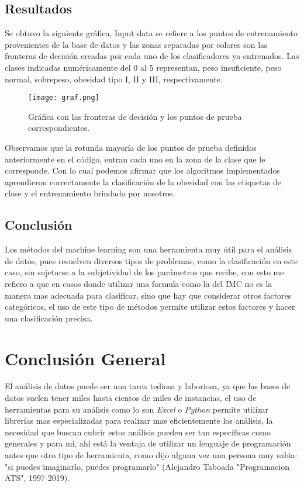 \documentclass{article}
\begin{document}
\subsection{Resultados}
Se obtuvo la siguiente gráfica, Input data se refiere a los puntos de entrenamiento provenientes de la base de datos y las zonas separadas por colores son las fronteras de decisión creadas por cada uno de los clasificadores ya entrenados. Las clases indicadas numéricamente del 0 al 5 representan, peso insuficiente, peso normal, sobrepeso, obesidad tipo I, II y III, respectivamente.

\begin{figure}[h!]
    \centering
    \texttt{[image: graf.png]}
    \caption{Gráfica con las fronteras de decisión y los puntos de prueba correspondientes.}
    \label{fig:graph}
\end{figure}

Observamos que la rotunda mayoría de los puntos de prueba definidos anteriormente en el código, entran cada uno en la zona de la clase que le corresponde. Con lo cual podemos afirmar que los algoritmos implementados aprendieron correctamente la clasificación de la obesidad con las etiquetas de clase y el entrenamiento brindado por nosotros.

\subsection{Conclusión}
Los métodos del machine learning son una herramienta muy útil para el análisis de datos, pues resuelven diversos tipos de problemas, como la clasificación en este caso, sin sujetarse a la subjetividad de los parámetros que recibe, con esto me refiero a que en casos donde utilizar una formula como la del IMC no es la manera mas adecuada para clasificar, sino que hay que considerar otros factores categóricos, el uso de este tipo de métodos permite utilizar estos factores y hacer una clasificación precisa.

\section{Conclusión General}
El análisis de datos puede ser una tarea tediosa y laboriosa, ya que las bases de datos suelen tener miles hasta cientos de miles de instancias, el uso de herramientas para su análisis como lo son \textit{Excel} o \textit{Python} permite utilizar librerías mas especializadas para realizar mas eficientemente los análisis, la necesidad que buscan cubrir estos análisis pueden ser tan especificas como generales y para mi, ahí está la ventaja de utilizar un lenguaje de programación antes que otro tipo de herramienta, como dijo alguna vez una persona muy sabia: "si puedes imaginarlo, puedes programarlo" (Alejandro Taboada "Programacion ATS", 1997-2019).
\end{document}
